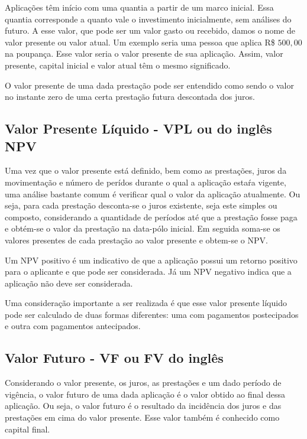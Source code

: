 Aplicações têm início com uma quantia a partir de um marco inicial. Essa quantia corresponde a quanto vale o investimento inicialmente, sem análises do futuro. A esse valor, que pode ser um valor gasto ou recebido, damos o nome de valor presente ou valor atual. Um exemplo seria uma pessoa que aplica R\$ $500,00$ na poupança. Esse valor seria o valor presente de sua aplicação. Assim, valor presente, capital inicial e valor atual têm o mesmo significado.

O valor presente de uma dada prestação pode ser entendido como sendo o valor no instante zero de uma certa prestação futura descontada dos juros.

\subsection{Valor Presente Líquido - VPL ou do inglês NPV}

Uma vez que o valor presente está definido, bem como as prestações, juros da movimentação e número de perídos durante o qual a aplicação estaŕa vigente, uma análise bastante comum é verificar qual o valor da aplicação atualmente. Ou seja, para cada prestação desconta-se o juros existente, seja este simples ou composto, considerando a quantidade de períodos até que a prestação fosse paga e obtém-se o valor da prestação na data-pólo inicial. Em seguida soma-se os valores presentes de cada prestação ao valor presente e obtem-se o NPV.

Um NPV positivo é um indicativo de que a aplicação possui um retorno positivo para o aplicante e que pode ser considerada. Já um NPV negativo indica que a aplicação não deve ser considerada. \cite{vpl}

Uma consideração importante a ser realizada é que esse valor presente líquido pode ser calculado de duas formas diferentes: uma com pagamentos postecipados e outra com pagamentos antecipados.

\subsection{Valor Futuro - VF ou FV do inglês}

Considerando o valor presente, os juros, as prestações e um dado período de vigência, o valor futuro de uma dada aplicação é o valor obtido ao final dessa aplicação. Ou seja, o valor futuro é o resultado da incidência dos juros e das prestações em cima do valor presente. Esse valor também é conhecido como capital final.

